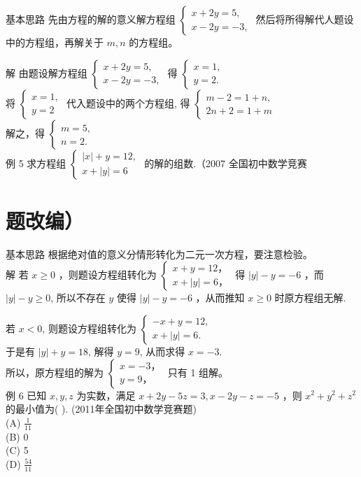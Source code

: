 \documentclass[10pt]{article}
\begin{document}
基本思路 先由方程的解的意义解方程组 $\left\{\begin{array}{l}x+2 y=5, \\ x-2 y=-3,\end{array}\right.$ 然后将所得解代人题设中的方程组，再解关于 $m, n$ 的方程组。

解 由题设解方程组 $\left\{\begin{array}{l}x+2 y=5, \\ x-2 y=-3,\end{array}\right.$ 得 $\left\{\begin{array}{l}x=1, \\ y=2 .\end{array}\right.$\\
将 $\left\{\begin{array}{l}x=1, \\ y=2\end{array}\right.$ 代入题设中的两个方程组, 得 $\left\{\begin{array}{l}m-2=1+n, \\ 2 n+2=1+m\end{array}\right.$\\
解之，得 $\left\{\begin{array}{l}m=5, \\ n=2 .\end{array}\right.$\\
例 5 求方程组 $\left\{\begin{array}{l}|x|+y=12, \\ x+|y|=6\end{array}\right.$ 的解的组数.（2007 全国初中数学竞赛

\section*{题改编）}
基本思路 根据绝对值的意义分情形转化为二元一次方程，要注意检验。\\
解 若 $x \geqslant 0$ ，则题设方程组转化为 $\left\{\begin{array}{l}x+y=12 ， \\ x+|y|=6 ，\end{array}\right.$ 得 $|y|-y=-6$ ，而 $|y|-y \geqslant 0$, 所以不存在 $y$ 使得 $|y|-y=-6$ ，从而推知 $x \geqslant 0$ 时原方程组无解.

若 $x<0$, 则题设方程组转化为 $\left\{\begin{array}{l}-x+y=12, \\ x+|y|=6 .\end{array}\right.$\\
于是有 $|y|+y=18$, 解得 $y=9$, 从而求得 $x=-3$.\\
所以，原方程组的解为 $\left\{\begin{array}{l}x=-3 ， \\ y=9 ，\end{array}\right.$ 只有 1 组解。\\
例 6 已知 $x, y, z$ 为实数，满足 $x+2 y-5 z=3, x-2 y-z=-5$ ，则 $x^{2}+y^{2}+z^{2}$ 的最小值为( ). (2011年全国初中数学竞赛题)\\
(A) $\frac{1}{11}$\\
(B) 0\\
(C) 5\\
(D) $\frac{54}{11}$
\end{document}
